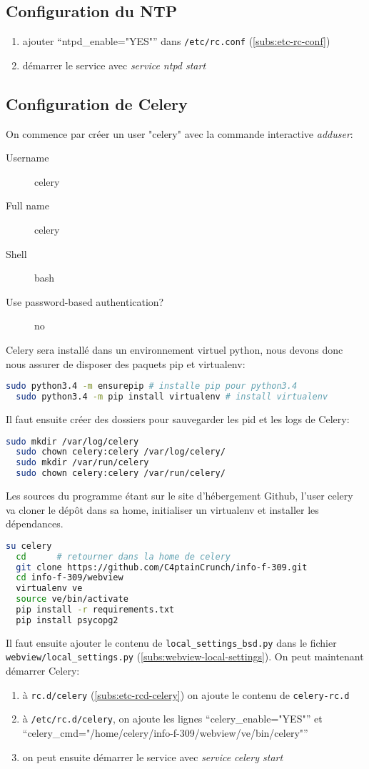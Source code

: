 \documentclass[10pt,a4paper]{article}
\begin{document}
\subsection{Configuration du NTP}
\begin{enumerate}
  \item ajouter ``ntpd\_enable="YES"'' dans \texttt{/etc/rc.conf} (\ref{subs:etc-rc-conf})
  \item démarrer le service avec \emph{service ntpd start}
\end{enumerate}

\subsection{Configuration de Celery}
On commence par créer un user "celery" avec la commande interactive \emph{adduser}:
\begin{description}
  \item[Username] celery
  \item[Full name] celery
  \item[Shell] bash
  \item[Use password-based authentication?] no
\end{description}
Celery sera installé dans un environnement virtuel python, nous devons donc nous assurer de disposer des paquets pip et virtualenv:
\begin{lstlisting}[language=bash]
  sudo python3.4 -m ensurepip # installe pip pour python3.4
  sudo python3.4 -m pip install virtualenv # install virtualenv
\end{lstlisting}
Il faut ensuite créer des dossiers pour sauvegarder les pid et les logs de Celery:
\begin{lstlisting}[language=bash]
  sudo mkdir /var/log/celery
  sudo chown celery:celery /var/log/celery/
  sudo mkdir /var/run/celery
  sudo chown celery:celery /var/run/celery/
\end{lstlisting}
Les sources du programme étant sur le site d'hébergement Github, l'user celery va cloner le dépôt dans sa home, initialiser un virtualenv et installer les dépendances.
\begin{lstlisting}[language=bash]
  su celery
  cd      # retourner dans la home de celery
  git clone https://github.com/C4ptainCrunch/info-f-309.git
  cd info-f-309/webview
  virtualenv ve
  source ve/bin/activate
  pip install -r requirements.txt
  pip install psycopg2
\end{lstlisting}

Il faut ensuite ajouter le contenu de \texttt{local\_settings\_bsd.py} dans le fichier \texttt{webview/local\_settings.py} (\ref{subs:webview-local-settings}).
On peut maintenant démarrer Celery:
\begin{enumerate}
  \item à \texttt{rc.d/celery} (\ref{subs:etc-rcd-celery}) on ajoute le contenu de \texttt{celery-rc.d}
  \item à \texttt{/etc/rc.d/celery}, on ajoute les lignes ``celery\_enable="YES"'' et ``celery\_cmd="/home/celery/info-f-309/webview/ve/bin/celery"''
  \item on peut ensuite démarrer le service avec \emph{service celery start}
\end{enumerate}
\end{document}
